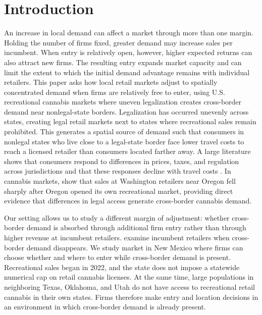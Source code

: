 \documentclass[english,12pt]{article}
\begin{document}
\begin{abstract}
Overall, the findings show that the economic effects of spatially concentrated demand depend not only on the size of the demand opportunity, but on how easily firms can enter, and on which firms -- independent or chain -- choose to enter.

\medskip
\noindent \textbf{JEL classification:} L13, L51, H71, R12, K23 \\
\noindent \textbf{Keywords:} Cannabis legalization; Cross-border demand; Market entry regulation; Free entry; Strategic entry game; Organizational form; Border premium
\end{abstract}

\doublespacing
\newpage

\section{Introduction}


An increase in local demand can affect a market through more than one margin. Holding the number of firms fixed, greater demand may increase sales per incumbent. When entry is relatively open, however, higher expected returns can also attract new firms. The resulting entry expands market capacity and can limit the extent to which the initial demand advantage remains with individual retailers. This paper asks how local retail markets adjust to spatially concentrated demand when firms are relatively free to enter, using U.S. recreational cannabis markets where uneven legalization creates cross-border demand near nonlegal-state borders. Legalization has occurred unevenly across states, creating legal retail markets next to states where recreational sales remain prohibited. This generates a spatial source of demand such that consumers in nonlegal states who live close to a legal-state border face lower travel costs to reach a licensed retailer than consumers located farther away. A large literature shows that consumers respond to differences in prices, taxes, and regulation across jurisdictions and that these responses decline with travel costs \citep{AsplundFribergWilander2007,Lovenheim2008,ChandraHeadTappata2014}. In cannabis markets, \citet{HansenMillerWeber2020} show that sales at Washington retailers near Oregon fell sharply after Oregon opened its own recreational market, providing direct evidence that differences in legal access generate cross-border cannabis demand.

Our setting allows us to study a different margin of adjustment: whether cross-border demand is absorbed through additional firm entry rather than through higher revenue at incumbent retailers. \citet{HansenMillerWeber2020} examine incumbent retailers when cross-border demand disappears. We study market in New Mexico where firms can choose whether and where to enter while cross-border demand is present. Recreational sales began in 2022, and the state does not impose a statewide numerical cap on retail cannabis licenses. At the same time, large populations in neighboring Texas, Oklahoma, and Utah do not have access to recreational retail cannabis in their own states. Firms therefore make entry and location decisions in an environment in which cross-border demand is already present.
\end{document}
